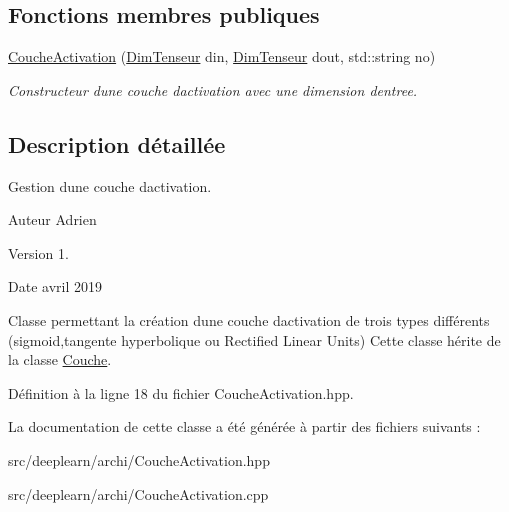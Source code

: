 \subsection*{Fonctions membres publiques}
\begin{DoxyCompactItemize}
\item 
\mbox{\label{class_couche_activation_a7ac67e43f62ade7fbf4652a64e7281e4}} 
\hyperlink{class_couche_activation_a7ac67e43f62ade7fbf4652a64e7281e4}{Couche\+Activation} (\hyperlink{class_dim_tenseur}{Dim\+Tenseur} din, \hyperlink{class_dim_tenseur}{Dim\+Tenseur} dout, std\+::string no)
\begin{DoxyCompactList}\small\item\em Constructeur d\textquotesingle{}une couche d\textquotesingle{}activation avec une dimension d\textquotesingle{}entree. \end{DoxyCompactList}\end{DoxyCompactItemize}


\subsection{Description détaillée}
Gestion d\textquotesingle{}une couche d\textquotesingle{}activation. 

\begin{DoxyAuthor}{Auteur}
Adrien 
\end{DoxyAuthor}
\begin{DoxyVersion}{Version}
1. 
\end{DoxyVersion}
\begin{DoxyDate}{Date}
avril 2019
\end{DoxyDate}
Classe permettant la création d\textquotesingle{}une couche d\textquotesingle{}activation de trois types différents (sigmoid,tangente hyperbolique ou Rectified Linear Units) Cette classe hérite de la classe \hyperlink{class_couche}{Couche}. 

Définition à la ligne 18 du fichier Couche\+Activation.\+hpp.



La documentation de cette classe a été générée à partir des fichiers suivants \+:\begin{DoxyCompactItemize}
\item 
src/deeplearn/archi/Couche\+Activation.\+hpp\item 
src/deeplearn/archi/Couche\+Activation.\+cpp\end{DoxyCompactItemize}
